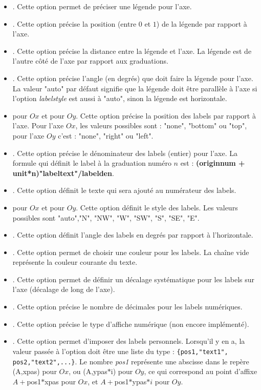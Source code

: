 \begin{itemize}
\begin{itemize}
            \item {}. Cette option permet de préciser une légende pour l'axe.
            \item {}. Cette option précise la position (entre $0$ et $1$) de la légende par rapport à l'axe.
            \item {}. Cette option précise la distance entre la légende et l'axe. La légende est de l'autre côté de l'axe par rapport aux graduations.
            \item {}. Cette option précise l'angle (en degrés) que doit faire la légende pour l'axe. La valeur "auto" par défaut signifie que la légende doit être parallèle à l'axe si l'option \emph{labelstyle} est aussi à "auto", sinon la légende est horizontale.
            \item {} pour $Ox$ et  pour $Oy$. Cette option précise la position des labels par rapport à l'axe. Pour l'axe $Ox$, les valeurs possibles sont : "none", "bottom" ou "top", pour l'axe $Oy$ c'est :  "none", "right" ou "left".
            \item {}. Cette option précise le dénominateur des labels (entier) pour l'axe. La formule qui définit le label à la graduation numéro $n$ est : \textbf{(originnum + unit*n)"labeltext"/labelden}.
            \item {}. Cette option définit le texte qui sera ajouté au numérateur des labels.
            \item {} pour $Ox$ et  pour $Oy$. Cette option définit le style des labels. Les valeurs possibles sont "auto","N", "NW", "W", "SW", "S", "SE", "E".
            \item {}. Cette option définit l'angle des labels en degrés par rapport à l'horizontale.
            \item {}. Cette option permet de choisir une couleur pour les labels. La chaîne vide représente la couleur courante du texte.
            \item {}. Cette option permet de définir un décalage systématique pour les labels sur l'axe (décalage de long de l'axe).
            \item {}. Cette option précise le nombre de décimales pour les labels numériques.
            \item {}. Cette option précise le type d'affiche numérique (non encore implémenté).
            \item {}. Cette option permet d'imposer des labels personnels. Lorsqu'il y en a, la valeur passée à l'option doit être une liste du type : \verb|{pos1,"text1", pos2,"text2",...}|. Le nombre \emph{pos1} représente une abscisse dans le repère (A,xpas) pour $Ox$, ou (A,ypas$*$i) pour $Oy$, ce qui correspond au point d'affixe $A+$pos1$*$xpas pour $Ox$, et $A+$pos1$*$ypas$*i$ pour $Oy$.
        \end{itemize}
\end{itemize}

